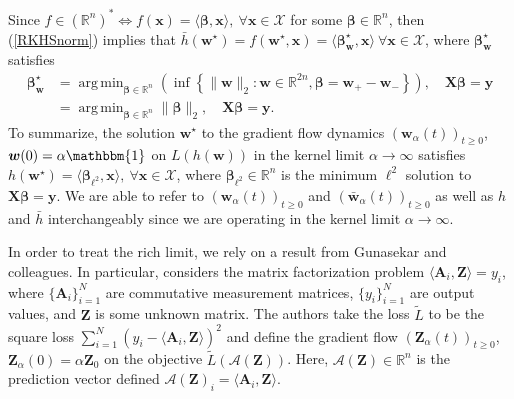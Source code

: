 \documentclass{article}
\DeclareMathOperator*{\argmin}{arg\,min}
\begin{document}
Since $f \in (\mathbb{R}^n)^* \Leftrightarrow f(\boldsymbol{x}) = \langle \boldsymbol{\beta}, \boldsymbol{x} \rangle, \ \forall \boldsymbol{x} \in \mathcal{X}$ for some $\boldsymbol{\beta} \in \mathbb{R}^n$, then (\ref{RKHSnorm}) implies that $\bar{h}(\boldsymbol{w}^{\star}) = f(\boldsymbol{w}^{\star}, \boldsymbol{x}) =  \langle \boldsymbol{\beta}_{\boldsymbol{w}}^{\star}, \boldsymbol{x} \rangle \ \forall \boldsymbol{x} \in \mathcal{X}$, where $\boldsymbol{\beta}_{\boldsymbol{w}}^{\star}$ satisfies
\begin{align*}
    \boldsymbol{\beta}_{\boldsymbol{w}}^{\star} &= \argmin_{\boldsymbol{\beta} \in \mathbb{R}^n} \left( \inf \left\{ \| \boldsymbol{w} \|_2 : \boldsymbol{w} \in \mathbb{R}^{2n},  \boldsymbol{\beta} = \boldsymbol{w}_+ - \boldsymbol{w}_- \right\}\right), \quad \boldsymbol{X}\boldsymbol{\beta} = \boldsymbol{y}\\
    &= \argmin_{\boldsymbol{\beta} \in \mathbb{R}^n} \| \boldsymbol{\beta} \|_2, \quad \boldsymbol{X}\boldsymbol{\beta} = \boldsymbol{y}.
\end{align*}
To summarize, the solution $\boldsymbol{w}^{\star}$ to the gradient flow dynamics $(\boldsymbol{w}_{\alpha}(t))_{t \geq 0}$, $\boldsymbol{w}(0) = \alpha \mathbbm{1}$ on $L(h(\boldsymbol{w}))$ in the kernel limit $\alpha \rightarrow \infty$ satisfies $h(\boldsymbol{w}^{\star}) =\langle \boldsymbol{\beta}_{\ell^2}, \boldsymbol{x} \rangle, \ \forall \boldsymbol{x} \in \mathcal{X}$, where $\boldsymbol{\beta}_{\ell^2} \in \mathbb{R}^n$ is the minimum $\ell^2$ solution to $\boldsymbol{X} \boldsymbol{\beta} = \boldsymbol{y}$. We are able to refer to $(\boldsymbol{w}_{\alpha}(t))_{t \geq 0}$ and $(\boldsymbol{\bar{w}}_{\alpha}(t))_{t \geq 0}$ as well as $h$ and $\bar{h}$ interchangeably since we are operating in the kernel limit $\alpha \rightarrow \infty$.

In order to treat the rich limit, we rely on a result from Gunasekar and colleagues. In particular, \cite{gunasekar2018implicit} considers the matrix factorization problem $\langle \boldsymbol{A}_i, \boldsymbol{Z} \rangle = y_i$, where $\{ \boldsymbol{A}_i \}_{i=1}^N$ are commutative measurement matrices, $\{ y_i \}_{i=1}^N$ are output values, and $\boldsymbol{Z}$ is some unknown matrix. The authors take the loss $\tilde{L}$  to be the square loss $\sum_{i=1}^N (y_i - \langle \boldsymbol{A}_i, \boldsymbol{Z} \rangle)^2$ and define the gradient flow $(\boldsymbol{Z}_{\alpha}(t))_{t \geq 0}$, $\boldsymbol{Z}_{\alpha}(0) = \alpha \boldsymbol{Z}_0$ on the objective $\tilde{L}(\mathcal{A}(\boldsymbol{Z}))$. Here, $\mathcal{A}(\boldsymbol{Z}) \in \mathbb{R}^n$ is the prediction vector defined $\mathcal{A}(\boldsymbol{Z})_i = \langle \boldsymbol{A}_i, \boldsymbol{Z} \rangle$. 
\end{document}
